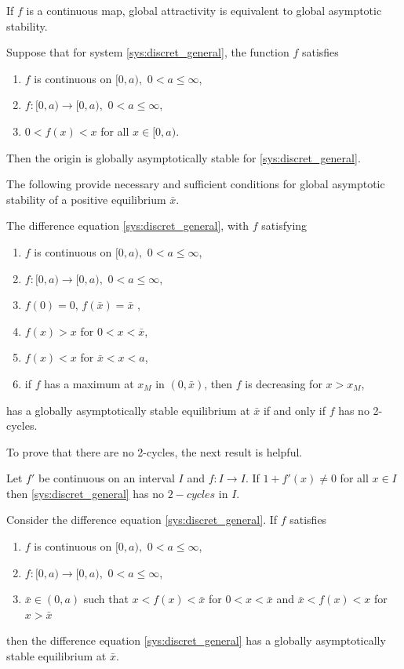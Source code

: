 If $f$ is a continuous map, global attractivity is equivalent to global asymptotic stability.
\begin{theorem}\label{th:gas_1}
Suppose that for system \eqref{sys:discret_general}, the function $f$ satisfies
\begin{enumerate}
\item $f$ is continuous on $[0,a),$ $0<a\leq \infty$,
\item $f: [0,a)\rightarrow [0,a),$ $0<a\leq \infty$,
\item $0<f(x)<x$ for all $x\in [0,a)$.
\end{enumerate}
Then the origin is globally asymptotically stable for \eqref{sys:discret_general}.
\end{theorem}



The following provide necessary and sufficient conditions for global asymptotic stability of a positive equilibrium $\bar x$.
\begin{theorem}\label{th:gas_2}
The difference equation \eqref{sys:discret_general}, with $f$ satisfying 
\begin{enumerate}
\item $f$ is continuous on $[0,a),$ $0<a\leq \infty$,
\item $f: [0,a)\rightarrow [0,a),$ $0<a\leq \infty$,
\item $f(0)=0$, $f(\bar x)=\bar x$ ,
\item $f(x)>x$ for $0<x<\bar x$,
\item $f(x)<x$ for $\bar x<x<a$,
\item if $f$ has a maximum at $x_M$ in $(0,\bar x)$, then $f$ is decreasing for $x>x_M$,
\end{enumerate}
has a globally asymptotically stable equilibrium at $\bar x$ if and only if $f$ has no 2-cycles.
\end{theorem}

To prove that there are no 2-cycles, the next result is helpful.
\begin{theorem}\label{th:no_cycles}
Let $f'$ be continuous on an interval $I$ and $f: I\rightarrow I$. If $1+f'(x)\not =0$ for all $x\in I$ then \eqref{sys:discret_general} has no $2-cycles$ in $I$.
\end{theorem}

\begin{theorem}\label{th:gas_3}
Consider the difference equation \eqref{sys:discret_general}. If $f$ satisfies
\begin{enumerate}
\item $f$ is continuous on $[0,a),$ $0<a\leq \infty$,
\item $f: [0,a)\rightarrow [0,a),$ $0<a\leq \infty$,
\item $\bar x \in (0,a)$ such that $x<f(x)<\bar x$ for $0<x<\bar x$
and $\bar x<f(x)< x$ for $x>\bar x$
\end{enumerate}
then the difference equation \eqref{sys:discret_general} has a globally asymptotically stable equilibrium at $\bar x$.
\end{theorem}


